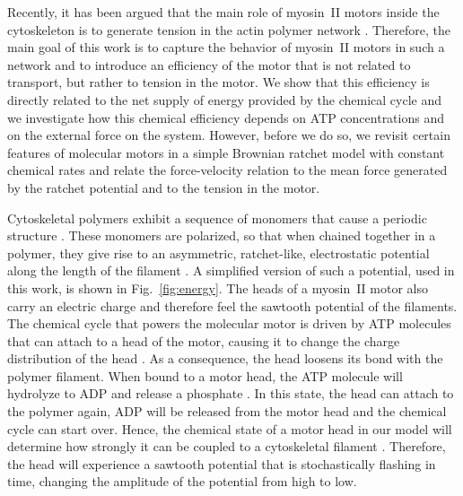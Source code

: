 \documentclass[aps,pre,twocolumn,showpacs,showkeys,superscriptaddress,floatfix]{revtex4-1}
\begin{document}
Recently, it has been argued that the main role of myosin~II motors inside the cytoskeleton is to generate tension in the actin polymer network \cite{ma2012nonmuscle,chugh2017actin,monier2010actomyosin}.
Therefore, the main goal of this work is to capture the behavior of myosin~II motors in such a network 
and to introduce an efficiency of the motor that is not related to transport, but rather to tension in the motor.
We show that this efficiency is directly related to the net supply of energy provided by the chemical cycle 
and we investigate how this chemical efficiency depends on ATP concentrations and on the external force on the system.
However, before we do so, we revisit certain features of molecular motors in a simple Brownian ratchet model \cite{reimann2002brownian} with constant chemical rates and relate the force-velocity relation to the mean force generated by the ratchet potential and to the tension in the motor.

Cytoskeletal polymers exhibit a sequence of monomers that cause a periodic structure \cite{yogurtcu2012mechanochemical}. 
These monomers are polarized, so that when chained together in a polymer, they give rise to an asymmetric, ratchet-like, electrostatic potential along the length of the filament \cite{Nie2014,nie2014conformational}. 
A simplified version of such a potential, used in this work, is shown in Fig.~\ref{fig:energy}. 
The heads of a myosin~II motor also carry an electric charge \cite{barterls1993myosin} and  therefore feel the sawtooth potential of the filaments.
The chemical cycle that powers the molecular motor is driven by ATP molecules that can attach to a head of the motor, causing it to change the charge distribution of the head \cite{adelstein1980regulation}.
As a consequence, the head loosens its bond with the polymer filament. 
When bound to a motor head, the ATP molecule will hydrolyze to ADP and release a phosphate \cite{gajewski1986thermodynamics}. 
In this state, the head can attach to the polymer again, ADP will be released from the motor head and the chemical cycle can start over. 
Hence, the chemical state of a motor head in our model will determine how strongly it can be coupled to a cytoskeletal filament \cite{Nie2014,nie2014conformational}. 
Therefore, the head will experience a sawtooth potential that is stochastically flashing in time, changing the amplitude of the potential from high to low.
\end{document}
